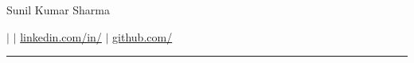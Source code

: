 \begin{center}
    {\HUGE Sunil Kumar Sharma}

    \vspace{.5em}
    {\normalsize
    \phone \hspace{.4em}$\vert$\hspace{.4em}
    \href{mailto:\email}{\email} \hspace{.4em}$\vert$\hspace{.4em}
    \href{https://www.linkedin.com/in/\LinkedIn}{linkedin.com/in/\LinkedIn} \hspace{.4em}$\vert$\hspace{.4em}
    \href{https://github.com/\github}{github.com/\github}}

    \vspace{.3em}
    {\normalsize \location}

    \vspace{.4em}
    {\color{highlight} \hrule}
\end{center}
